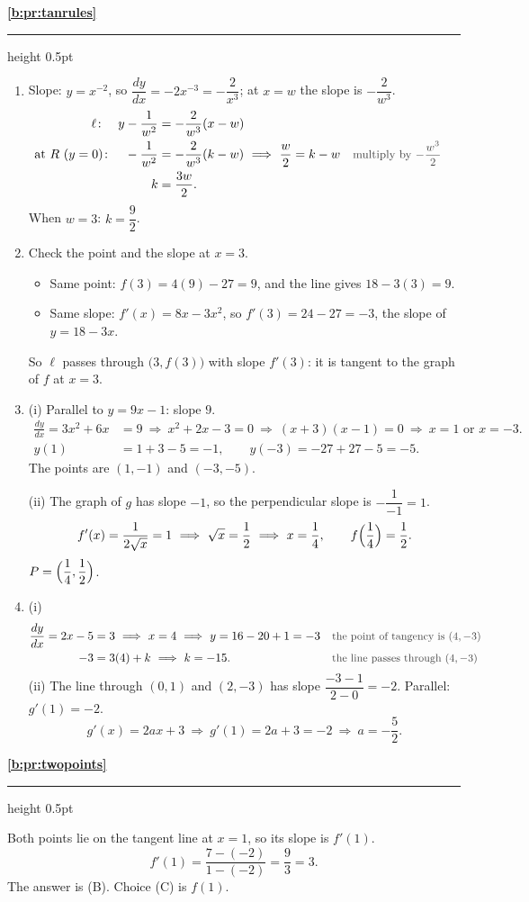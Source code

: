 \documentclass[11pt,a4paper]{article}
\newcommand{\solitem}[2]{%
 \par\addvspace{16pt}\Needspace{10\baselineskip}%
 {\large\bfseries \ref{#1}}\par\nobreak\vspace{2pt}%
 {\color{rulegray}\hrule height 0.5pt}\nobreak\vspace{7pt}%
 #2\par}
\newcommand{\why}[1]{\text{\small\color{darkgray}#1}}
\newcommand{\imp}{\ \Longrightarrow\ }
\begin{document}
\solitem{b:pr:tanrules}{%
\begin{enumerate}[label=(\alph*),start=8]
 \item Slope: $y=x^{-2}$, so $\dfrac{dy}{dx}=-2x^{-3}=-\dfrac{2}{x^3}$; at $x=w$ the slope is $-\dfrac{2}{w^3}$.
 \begin{align*}
 \ell\colon\quad y-\frac{1}{w^2}&=-\frac{2}{w^3}(x-w)\\
 \text{at } R\ (y=0)\colon\quad -\frac{1}{w^2}&=-\frac{2}{w^3}(k-w)\imp \frac{w}{2}=k-w &&\why{multiply by $-\dfrac{w^3}{2}$}\\
 k&=\frac{3w}{2}.
 \end{align*}
 When $w=3$: $k=\dfrac92$.
 \item Check the point and the slope at $x=3$.
 \begin{itemize}
  \item Same point: $f(3)=4(9)-27=9$, and the line gives $18-3(3)=9$.
  \item Same slope: $f'(x)=8x-3x^2$, so $f'(3)=24-27=-3$, the slope of $y=18-3x$.
 \end{itemize}
 So $\ell$ passes through $\bigl(3,f(3)\bigr)$ with slope $f'(3)$: it is tangent to the graph of $f$ at $x=3$.
 \item (i) Parallel to $y=9x-1$: slope $9$.
 \begin{align*}
 \frac{dy}{dx}=3x^2+6x&=9\imp x^2+2x-3=0\imp(x+3)(x-1)=0\imp x=1\text{ or }x=-3.\\
 y(1)&=1+3-5=-1,\qquad y(-3)=-27+27-5=-5.
 \end{align*}
 The points are $(1,-1)$ and $(-3,-5)$.

 (ii) The graph of $g$ has slope $-1$, so the perpendicular slope is $-\dfrac{1}{-1}=1$.
 \[
 f'(x)=\frac{1}{2\sqrt x}=1\imp\sqrt x=\frac12\imp x=\frac14,\qquad f\Bigl(\frac14\Bigr)=\frac12.
 \]
 $P=\Bigl(\dfrac14,\dfrac12\Bigr)$.
 \item (i)
 \begin{align*}
 \frac{dy}{dx}=2x-5&=3\imp x=4\imp y=16-20+1=-3 &&\why{the point of tangency is $(4,-3)$}\\
 -3&=3(4)+k\imp k=-15. &&\why{the line passes through $(4,-3)$}
 \end{align*}
 (ii) The line through $(0,1)$ and $(2,-3)$ has slope $\dfrac{-3-1}{2-0}=-2$. Parallel: $g'(1)=-2$.
 \[
 g'(x)=2ax+3\imp g'(1)=2a+3=-2\imp a=-\frac52.
 \]
\end{enumerate}
}

\solitem{b:pr:twopoints}{%
Both points lie on the tangent line at $x=1$, so its slope is $f'(1)$.
\[
f'(1)=\frac{7-(-2)}{1-(-2)}=\frac{9}{3}=3.
\]
The answer is (B). Choice (C) is $f(1)$.
}
\end{document}
